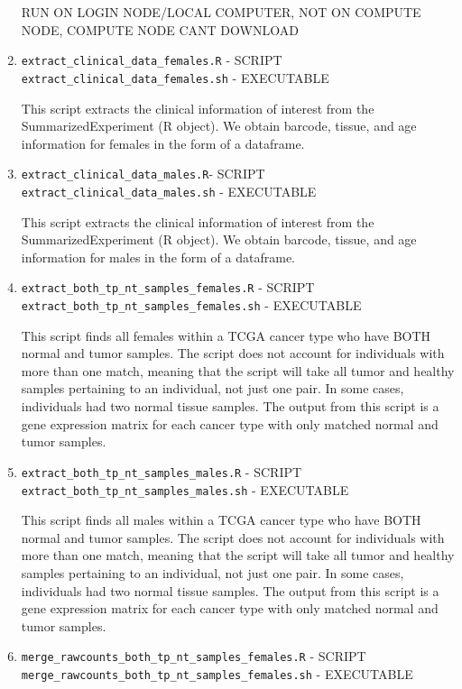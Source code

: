 \documentclass[10pt]{article}
\begin{document}
\begin{enumerate}
RUN ON LOGIN NODE/LOCAL COMPUTER, NOT ON COMPUTE NODE, COMPUTE NODE CANT DOWNLOAD
\item\texttt{extract\_clinical\_data\_females.R} - SCRIPT\newline
\texttt{extract\_clinical\_data\_females.sh} - EXECUTABLE

This script extracts the clinical information of interest from the SummarizedExperiment (R object). We obtain barcode, tissue, and age information for females in the form of a dataframe.

\item\texttt{extract\_clinical\_data\_males.R}- SCRIPT\newline
\texttt{extract\_clinical\_data\_males.sh} - EXECUTABLE

This script extracts the clinical information of interest from the SummarizedExperiment (R object). We obtain barcode, tissue, and age information for males in the form of a dataframe.

\item\texttt{extract\_both\_tp\_nt\_samples\_females.R} - SCRIPT \newline
\texttt{extract\_both\_tp\_nt\_samples\_females.sh} - EXECUTABLE

This script finds all females within a TCGA cancer type who have BOTH normal and tumor samples. The script does not account for individuals with more than one match, meaning that the script will take all tumor and healthy samples pertaining to an individual, not just one pair. In some cases, individuals had two normal tissue samples. The output from this script is a gene expression matrix for each cancer type with only matched normal and tumor samples.

\item\texttt{extract\_both\_tp\_nt\_samples\_males.R} - SCRIPT \newline
\texttt{extract\_both\_tp\_nt\_samples\_males.sh} - EXECUTABLE

This script finds all males within a TCGA cancer type who have BOTH normal and tumor samples. The script does not account for individuals with more than one match, meaning that the script will take all tumor and healthy samples pertaining to an individual, not just one pair. In some cases, individuals had two normal tissue samples. The output from this script is a gene expression matrix for each cancer type with only matched normal and tumor samples.

\item\texttt{merge\_rawcounts\_both\_tp\_nt\_samples\_females.R} - SCRIPT \newline
\texttt{merge\_rawcounts\_both\_tp\_nt\_samples\_females.sh} - EXECUTABLE


\end{enumerate}
\end{document}
